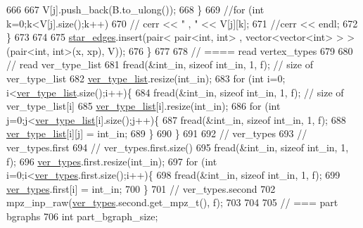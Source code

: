 \begin{DoxyCode}
666 
667         V[j].push\_back(B.to\_ulong());
668       \}
669       \textcolor{comment}{//for (int k=0;k<V[j].size();k++)}
670       \textcolor{comment}{//  cerr << " , " << V[j][k];}
671       \textcolor{comment}{//cerr << endl;}
672     \}
673 
674 
675     \hyperlink{classmarked__graph__compressed_a7df5779d313486644132bd816937f532}{star\_edges}.insert(pair< pair<int, int> , vector<vector<int> > > (pair<int, int>(x, xp), V));
676   \}
677 
678   \textcolor{comment}{// ==== read vertex\_types}
679 
680   \textcolor{comment}{// read ver\_type\_list}
681   fread(&int\_in, \textcolor{keyword}{sizeof} int\_in, 1, f); \textcolor{comment}{// size of ver\_type\_list}
682   \hyperlink{classmarked__graph__compressed_af2e3e55223d436628a02758dfae88493}{ver\_type\_list}.resize(int\_in);
683   \textcolor{keywordflow}{for} (\textcolor{keywordtype}{int} i=0; i<\hyperlink{classmarked__graph__compressed_af2e3e55223d436628a02758dfae88493}{ver\_type\_list}.size();i++)\{
684     fread(&int\_in, \textcolor{keyword}{sizeof} int\_in, 1, f); \textcolor{comment}{// size of ver\_type\_list[i]}
685     \hyperlink{classmarked__graph__compressed_af2e3e55223d436628a02758dfae88493}{ver\_type\_list}[i].resize(int\_in);
686     \textcolor{keywordflow}{for} (\textcolor{keywordtype}{int} j=0;j<\hyperlink{classmarked__graph__compressed_af2e3e55223d436628a02758dfae88493}{ver\_type\_list}[i].size();j++)\{
687       fread(&int\_in, \textcolor{keyword}{sizeof} int\_in, 1, f);
688       \hyperlink{classmarked__graph__compressed_af2e3e55223d436628a02758dfae88493}{ver\_type\_list}[i][j] = int\_in;
689     \}
690   \}
691 
692   \textcolor{comment}{// ver\_types}
693   \textcolor{comment}{// ver\_types.first}
694   \textcolor{comment}{// ver\_types.first.size()}
695   fread(&int\_in, \textcolor{keyword}{sizeof} int\_in, 1, f);
696   \hyperlink{classmarked__graph__compressed_af446cc5e23c241a92b76642fd5ebc403}{ver\_types}.first.resize(int\_in);
697   \textcolor{keywordflow}{for} (\textcolor{keywordtype}{int} i=0;i<\hyperlink{classmarked__graph__compressed_af446cc5e23c241a92b76642fd5ebc403}{ver\_types}.first.size();i++)\{
698     fread(&int\_in, \textcolor{keyword}{sizeof} int\_in, 1, f);
699     \hyperlink{classmarked__graph__compressed_af446cc5e23c241a92b76642fd5ebc403}{ver\_types}.first[i] = int\_in;
700   \}
701   \textcolor{comment}{// ver\_types.second}
702   mpz\_inp\_raw(\hyperlink{classmarked__graph__compressed_af446cc5e23c241a92b76642fd5ebc403}{ver\_types}.second.get\_mpz\_t(), f);
703 
704 
705   \textcolor{comment}{// === part bgraphs}
706   \textcolor{keywordtype}{int} part\_bgraph\_size;

\end{DoxyCode}
